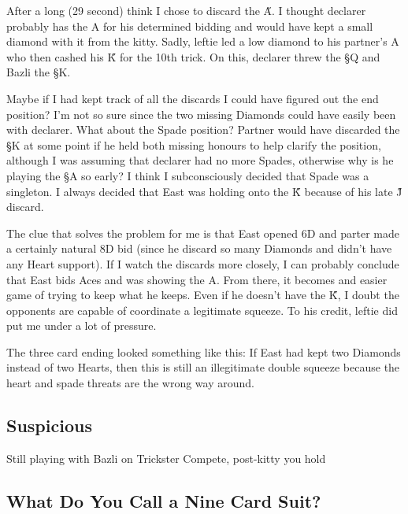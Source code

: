 \documentclass[a4paper]{JoshCards}
\begin{document}
After a long (29 second) think I chose to discard the \H A. I thought declarer probably has the \D A for his determined bidding and would have kept a small diamond with it from the kitty. Sadly, leftie led a low diamond to his partner's \D A who then cashed his \H K for the 10th trick. On this, declarer threw the \S Q and Bazli the \S K. 

Maybe if I had kept track of all the discards I could have figured out the end position? I'm not so sure since the two missing Diamonds could have easily been with declarer. What about the Spade position? Partner would have discarded the \S K at some point if he held both missing honours to help clarify the position, although I was assuming that declarer had no more Spades, otherwise why is he playing the \S A so early? I think I subconsciously decided that Spade was a singleton. I always decided that East was holding onto the \H K because of his late \H J discard.

The clue that solves the problem for me is that East opened 6D and parter made a certainly natural 8D bid (since he discard so many Diamonds and didn't have any Heart support). If I watch the discards more closely, I can probably conclude that East bids Aces and was showing the \D A. From there, it becomes and easier game of trying to keep what he keeps. Even if he doesn't have the \H K, I doubt the opponents are capable of coordinate a legitimate squeeze. To his credit, leftie did put me under a lot of pressure. 

The three card ending looked something like this:
\gamefont{\larger}
\leftupper{}%
{}{}
\rightupper{}{}{}
\rightlower{}{}{}
\showAll*
If East had kept two Diamonds instead of two Hearts, then this is still an illegitimate double squeeze because the heart and spade threats are the wrong way around. 

\subsection*{Suspicious}

Still playing with Bazli on Trickster Compete, post-kitty you hold 
\begin{center}
\end{center}


\newpage

\subsection*{What Do You Call a Nine Card Suit?}
\end{document}
